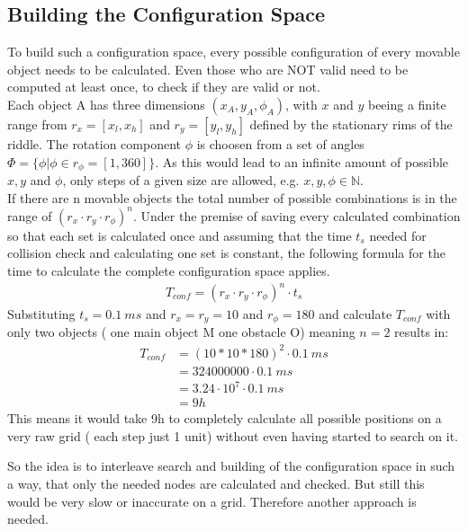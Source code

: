 \subsection{Building the Configuration Space}
\label{subsec:confspace}
To build such a configuration space, every possible configuration of every movable object needs to be calculated. Even those who are NOT valid need to be computed at least once, to check if they are valid or not.\\
Each object A has three dimensions $(x_A,y_A,\phi_A)$, with $x$ and $y$ beeing a finite range from $r_x=[x_l, x_h]$ and $r_y=[y_l, y_h]$ defined by the stationary rims of the riddle. The rotation component $\phi$ is choosen from a set of angles $\Phi = \{ \phi | \phi \in r_\phi=[1, 360] \}$. As this would lead to an infinite amount of possible $x,y$ and $\phi$, only steps of a given size are allowed, e.g. $x,y,\phi \in \mathbb{N}$.\\
If there are n movable objects the total number of possible combinations is in the range of $(r_x\cdot r_y \cdot r_\phi )^n$.
Under the premise of saving every calculated combination so that each set is calculated once and assuming that the time $t_s$ needed for collision check and calculating one set is constant, the following formula for the time to calculate the complete configuration space applies.
\begin{align*}
 T_{conf} = (r_x\cdot r_y \cdot r_\phi )^n \cdot t_s
\end{align*}
 Substituting $t_s = 0.1~ ms$ and $r_x = r_y = 10$ and $r_\phi = 180$ and calculate $T_{conf}$ with only two objects ( one main object M one obstacle O) meaning $n=2$ results in:
\begin{align*}
T_{conf} &= (10*10*180)^2 \cdot 0.1~ ms\\
	&=   324000000 \cdot 0.1~ ms\\
	&= 3.24 \cdot 10^7 \cdot 0.1~ ms\\
	&= 9 h
\end{align*} 
This means it would take 9h to completely calculate all possible positions on a very raw grid ( each step just 1 unit) without even having started to search on it.

So the idea is to interleave search and building of the configuration space in such a way, that only the needed nodes are calculated and checked.
But still this would be very slow or inaccurate on a grid. Therefore another approach is needed.\\


